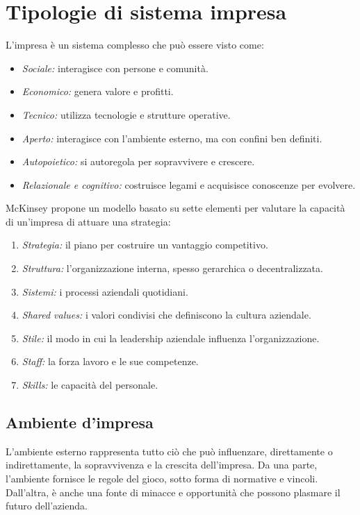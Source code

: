 \section{Tipologie di sistema impresa}
L’impresa è un sistema complesso che può essere visto come:
\begin{itemize}
    \item \textit{Sociale:} interagisce con persone e comunità.
    \item \textit{Economico:} genera valore e profitti.
    \item \textit{Tecnico:} utilizza tecnologie e strutture operative.
    \item \textit{Aperto:} interagisce con l’ambiente esterno, ma con confini ben definiti.
    \item \textit{Autopoietico:} si autoregola per sopravvivere e crescere.
    \item \textit{Relazionale e cognitivo:} costruisce legami e acquisisce conoscenze per evolvere.
\end{itemize}
McKinsey propone un modello basato su sette elementi per valutare la capacità di un’impresa di attuare una strategia:
\begin{enumerate}
    \item \textit{Strategia:} il piano per costruire un vantaggio competitivo.
    \item \textit{Struttura:} l’organizzazione interna, spesso gerarchica o decentralizzata.
    \item \textit{Sistemi:} i processi aziendali quotidiani.
    \item \textit{Shared values:} i valori condivisi che definiscono la cultura aziendale.
    \item \textit{Stile:} il modo in cui la leadership aziendale influenza l’organizzazione.
    \item \textit{Staff:} la forza lavoro e le sue competenze.
    \item \textit{Skills:} le capacità del personale.
\end{enumerate}

\subsection{Ambiente d'impresa}
L’ambiente esterno rappresenta tutto ciò che può influenzare, direttamente o indirettamente, la sopravvivenza e la crescita dell’impresa. Da una parte, l’ambiente fornisce le regole del gioco, sotto forma di normative e vincoli. Dall’altra, è anche una fonte di minacce e opportunità che possono plasmare il futuro dell’azienda. 

